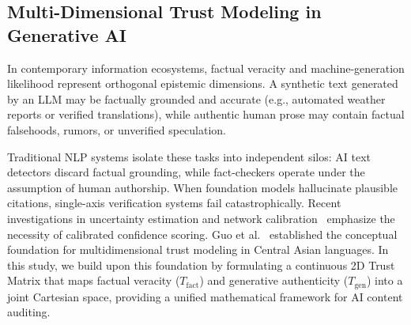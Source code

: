 \subsection{Multi-Dimensional Trust Modeling in Generative AI}
In contemporary information ecosystems, factual veracity and machine-generation likelihood represent orthogonal epistemic dimensions. A synthetic text generated by an LLM may be factually grounded and accurate (e.g., automated weather reports or verified translations), while authentic human prose may contain factual falsehoods, rumors, or unverified speculation. 

Traditional NLP systems isolate these tasks into independent silos: AI text detectors discard factual grounding, while fact-checkers operate under the assumption of human authorship. When foundation models hallucinate plausible citations, single-axis verification systems fail catastrophically. Recent investigations in uncertainty estimation and network calibration~\citep{guo2017calibration} emphasize the necessity of calibrated confidence scoring. Guo et al.~\citep{guo2026kazakh} established the conceptual foundation for multidimensional trust modeling in Central Asian languages. In this study, we build upon this foundation by formulating a continuous 2D Trust Matrix that maps factual veracity ($T_{\text{fact}}$) and generative authenticity ($T_{\text{gen}}$) into a joint Cartesian space, providing a unified mathematical framework for AI content auditing.
